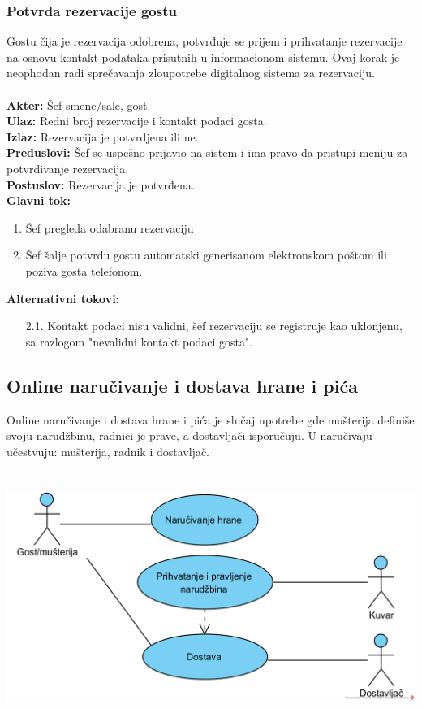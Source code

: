 \documentclass{article}
\begin{document}
\subsubsection{Potvrda rezervacije gostu}
Gostu čija je rezervacija odobrena, potvrđuje se prijem i prihvatanje rezervacije na osnovu kontakt podataka prisutnih u informacionom sistemu. Ovaj korak je neophodan radi sprečavanja zloupotrebe digitalnog sistema za rezervaciju.\\\\
\textbf{Akter:} Šef smene/sale, gost.\\
\textbf{Ulaz:} Redni broj rezervacije i kontakt podaci gosta.\\
\textbf{Izlaz:} Rezervacija je potvrdjena ili ne.\\
\textbf{Preduslovi:} Šef se uspešno prijavio na sistem i ima pravo da pristupi meniju za potvrđivanje rezervacija.\\
\textbf{Postuslov:} Rezervacija je potvrđena.\\
\textbf{Glavni tok:}
\begin{enumerate}
\item Šef pregleda odabranu rezervaciju
\item Šef šalje potvrdu gostu automatski generisanom elektronskom poštom ili poziva gosta telefonom.\\
\end{enumerate}
\textbf{Alternativni tokovi:}\\
\begin{itemize}
\item [2.1.] Kontakt podaci nisu validni, šef rezervaciju se  registruje kao uklonjenu, sa razlogom "nevalidni kontakt podaci gosta".
\end{itemize}
  

\subsection{Online naručivanje i dostava hrane i pića}
Online naručivanje i dostava hrane i pića je slučaj upotrebe gde mušterija definiše svoju narudžbinu, radnici je prave, a dostavljači isporučuju. U naručivaju učestvuju: mušterija, radnik i dostavljač.\\\\
\\
\includegraphics[width=\linewidth]{SU_6_dostava.png}
\end{document}
